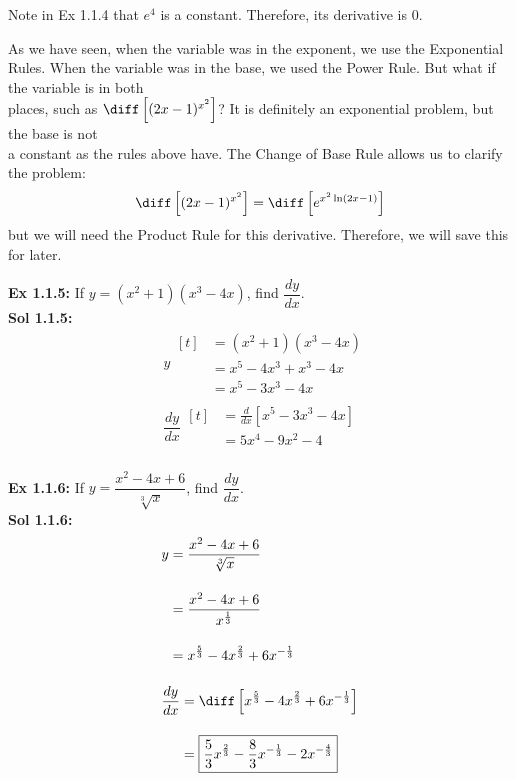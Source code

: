 Note in Ex 1.1.4 that $e^4$ is a constant. Therefore, its derivative is $0$. \par
As we have seen, when the variable was in the exponent, we use the Exponential Rules. When the variable was in the base, we used the Power Rule. But what if the variable is in both \\[5.5pt] places, such as $\diff\left[(2x - 1)^{x^2}\right]$? It is definitely an exponential problem, but the base is not \\[5.5pt] a constant as the rules above have. The Change of Base Rule allows us to clarify the problem: \begin{align*}
    \diff\left[(2x - 1)^{x^2}\right] = \diff\left[e^{x^2\ln(2x - 1)}\right]
\end{align*} but we will need the Product Rule for this derivative. Therefore, we will save this for later.

\textbf{Ex 1.1.5:} If $y = (x^2 + 1)(x^3 - 4x)$, find $\dfrac{dy}{dx}$. \\[11pt]
\textbf{Sol 1.1.5:} \begin{align*}
    & y \begin{aligned}[t]
        & = (x^2 + 1)(x^3 - 4x) \\[11pt]
        & = x^5 - 4x^3 + x^3 - 4x \\[11pt]
        & = x^5 - 3x^3 - 4x
    \end{aligned} \\[11pt]
    & \dfrac{dy}{dx} \begin{aligned}[t]
        & = \frac{d}{dx}\left[x^5 - 3x^3 - 4x\right] \\[11pt]
        & = \boxed{5x^4 - 9x^2 - 4} \\
    \end{aligned}
\end{align*} 

\textbf{Ex 1.1.6:} If $y = \dfrac{x^2 - 4x + 6}{\sqrt[3]{x}}$, find $\dfrac{dy}{dx}$. \\[11pt]
\textbf{Sol 1.1.6:} \begin{align*}
    & y \begin{aligned}[t]
        & = \dfrac{x^2 - 4x + 6}{\sqrt[3]{x}} \\[11pt]
        & = \dfrac{x^2 - 4x + 6}{x^{\frac{1}{3}}} \\[11pt]
        & = x^{\frac{5}{3}} - 4x^{\frac{2}{3}} + 6x^{-\frac{1}{3}}
    \end{aligned} \\[11pt]
    & \dfrac{dy}{dx} \begin{aligned}[t]
        & = \diff\left[x^{\frac{5}{3}} - 4x^{\frac{2}{3}} + 6x^{-\frac{1}{3}}\right] \\[11pt]
        & = \boxed{\dfrac{5}{3}x^{\frac{2}{3}} - \dfrac{8}{3}x^{-\frac{1}{3}} - 2x^{-\frac{4}{3}}}
    \end{aligned}
\end{align*}

